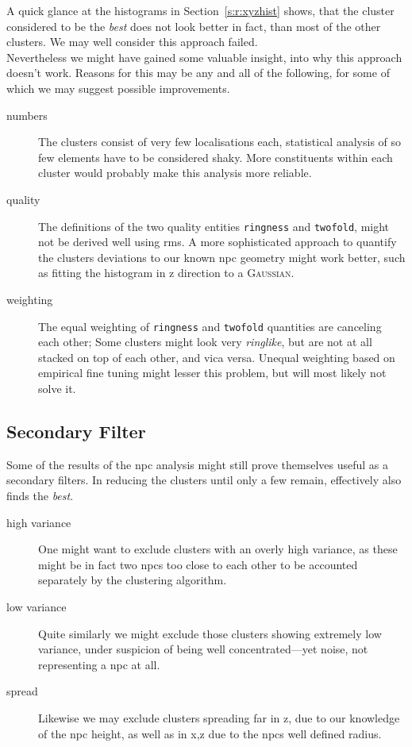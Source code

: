 \documentclass[11pt, a4paper, oneside, twocolumn]{report}
\renewcommand{\tt}{\texttt}
\newcommand{\e}{\emph}
\begin{document}
A quick glance at the histograms in Section~\ref{s:r:xyzhist} shows,
that the cluster considered to be the \e{best} does not look better in
fact, than most of the other clusters. We may well consider this
approach failed.\\

Nevertheless we might have gained some valuable insight, into why this
approach doesn't work. Reasons for this may be any and all of the
following, for some of which we may suggest possible improvements.

\begin{description}
\item [numbers] The clusters consist of very few localisations each,
  statistical analysis of so few elements have to be considered
  shaky. More constituents within each cluster would probably make
  this analysis more reliable.
\item [quality] The definitions of the two quality entities
  \tt{ringness} and \tt{twofold}, might not be derived well using
  \gls{rms}. A more sophisticated approach to quantify the clusters
  deviations to our known \gls{npc} geometry might work better, such
  as fitting the histogram in z direction to a \textsc{Gaussian}.
\item [weighting] The equal weighting of \tt{ringness} and
  \tt{twofold} quantities are canceling each other; Some clusters
  might look very \e{ringlike}, but are not at all stacked on top of
  each other, and vica versa. Unequal weighting based on empirical
  fine tuning might lesser this problem, but will most likely not
  solve it.
\end{description}


\subsection{Secondary Filter}

Some of the results of the \gls{npc} analysis might still prove
themselves useful as a secondary filters. In reducing the clusters
until only a few remain, effectively also finds the \e{best}.

\begin{description}
\item [high variance] One might want to exclude clusters with an
  overly high variance, as these might be in fact two \gls{npc}s too
  close to each other to be accounted separately by the clustering
  algorithm.
\item [low variance] Quite similarly we might exclude those clusters
  showing extremely low variance, under suspicion of being well
  concentrated---yet noise, not representing a \gls{npc} at all.
\item [spread] Likewise we may exclude clusters spreading far in z,
  due to our knowledge of the \gls{npc} height, as well as in x,z due
  to the \gls{npc}s well defined radius.
\end{description}
\end{document}
